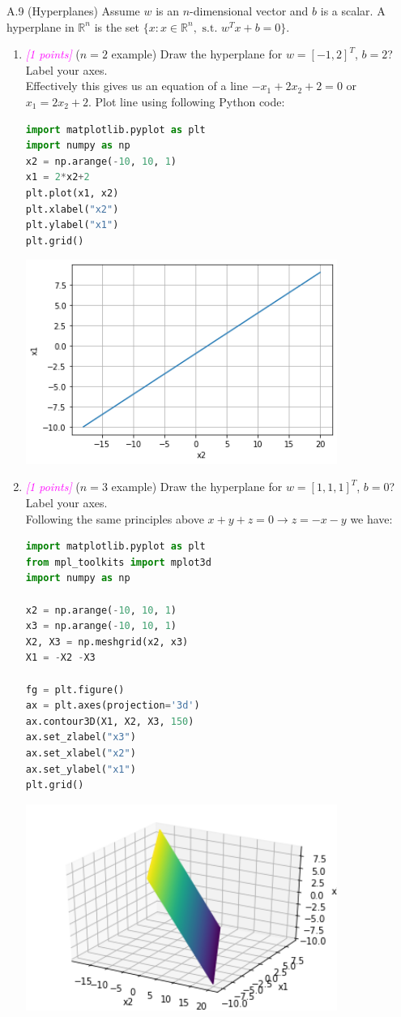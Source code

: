 \documentclass{article}
\newcommand{\field}[1]{\mathbb{#1}}
\newcommand{\1}{\mathbf{1}}
\newcommand{\R}{\field{R}} %
\newcommand{\points}[1]{\small\textcolor{magenta}{\emph{[#1 points]}} \normalsize}
\begin{document}
A.9 (Hyperplanes) Assume $w$ is an $n$-dimensional vector and $b$ is a scalar. A hyperplane in $\R^n$ is the set $\{x : x\in \R^n,\text{ s.t. } w^T x + b = 0\}$.
\begin{enumerate}
	\item \points{1} ($n=2$ example) Draw the hyperplane for $w=[-1,2]^T$, $b=2$? Label your axes. \\
	Effectively this gives us an equation of a line $-x_1+2x_2 + 2 = 0$ or $x_1 = 2x_2+2$. Plot line using following Python code:
	\begin{lstlisting}[language=Python]
import matplotlib.pyplot as plt
import numpy as np
x2 = np.arange(-10, 10, 1)
x1 = 2*x2+2
plt.plot(x1, x2)
plt.xlabel("x2")
plt.ylabel("x1")
plt.grid()
    \end{lstlisting}
    \begin{center}
    \includegraphics[width=4in]{HW0_plots/hyperplane.png}
    \end{center} 

	\item \points{1} ($n=3$ example) Draw the hyperplane for $w=[1,1,1]^T$, $b=0$? Label your axes. \\
	Following the same principles above $x+y+z=0 \rightarrow z=-x-y$ we have:
	\begin{lstlisting}[language=Python]
import matplotlib.pyplot as plt
from mpl_toolkits import mplot3d
import numpy as np

x2 = np.arange(-10, 10, 1)
x3 = np.arange(-10, 10, 1)
X2, X3 = np.meshgrid(x2, x3)
X1 = -X2 -X3

fg = plt.figure()
ax = plt.axes(projection='3d')
ax.contour3D(X1, X2, X3, 150)
ax.set_zlabel("x3")
ax.set_xlabel("x2")
ax.set_ylabel("x1")
plt.grid()
    \end{lstlisting}
    \begin{center}
    \includegraphics[width=4in]{HW0_plots/hyperplaneB.png}
    \end{center} 


\end{enumerate}
\end{document}
